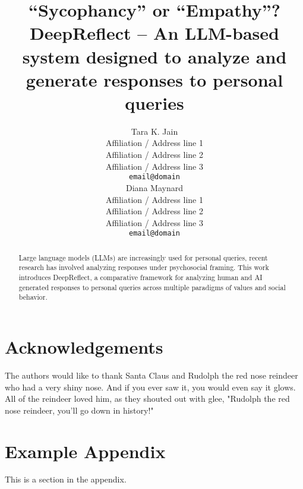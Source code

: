 \documentclass[11pt]{article}
\title{“Sycophancy” or “Empathy”? \\
DeepReflect – An LLM-based system designed to analyze and generate responses to personal queries 
}
\author{Tara K. Jain \\
  Affiliation / Address line 1 \\
  Affiliation / Address line 2 \\
  Affiliation / Address line 3 \\
  \texttt{email@domain} \\\And
  Diana Maynard \\
  Affiliation / Address line 1 \\
  Affiliation / Address line 2 \\
  Affiliation / Address line 3 \\
  \texttt{email@domain} \\}
\begin{document}
\maketitle
\begin{abstract}
Large language models (LLMs) are increasingly used for personal queries, recent research has involved analyzing responses under psychosocial framing. This work introduces DeepReflect, a comparative framework for analyzing human and AI generated responses to personal queries across multiple paradigms of values and social behavior.
\textcolor{black!30}{\lipsum[2-2]}
\end{abstract} 










\section*{Acknowledgements}
The authors would like to thank Santa Claus and Rudolph the red nose reindeer who had a very shiny nose. And if you ever saw it, you would even say it glows. All of the reindeer loved him, as they shouted out with glee, "Rudolph the red nose reindeer, you'll go down in history!"



\appendix

\section{Example Appendix}
\label{sec:appendix}

This is a section in the appendix.
\end{document}
